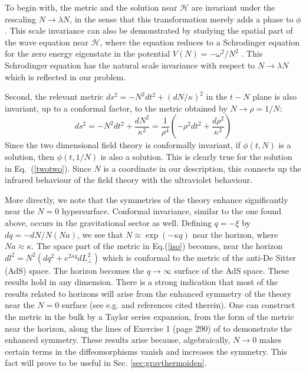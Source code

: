 \documentclass[12pt]{iopart}
\begin{document}
    To begin with, the  metric and the solution near $\mathcal{H}$ are  invariant under the rescaling
   $N\to \lambda N$,  in the sense that this transformation merely adds a phase  to 
   $\phi$. This scale invariance can also be demonstrated by studying the spatial part of the 
   wave equation \cite{Srinivasan:1998ty} near $\mathcal{H}$,  where the equation reduces to a
    Schrodinger equation
  for the zero energy eigenstate in
  the potential $V(N) = - \omega^2/N^2$ .
   This Schrodinger equation has the natural scale invariance with respect to $N\to \lambda N$
   which is reflected in our problem. 

Second, the relevant metric $ds^2=-N^2 dt^2+(dN/\kappa)^2$ in the $t-N$
plane is also invariant, up to a conformal factor, to the metric obtained by $N\to \rho=1/N$:
\begin{equation}
ds^2=-N^2 dt^2+\frac{dN^2}{\kappa^2}=\frac{1}{\rho^4}(-\rho^2 dt^2+\frac{d\rho^2}{\kappa^2})
\end{equation}
Since the two dimensional field theory is conformally invariant, if $\phi(t,N)$ is a solution, then
$\phi(t,1/N)$ is also a solution. This is clearly true for the solution in Eq.~(\ref{twotwo}). Since $N$ is a coordinate in our description, this connects up the infrared behaviour of the field theory with the ultraviolet behaviour.   

  More directly, we note that the symmetries of the theory enhance significantly near the
$N=0$ hypersurface.
Conformal invariance,  similar to the one found above, occurs in the  gravitational sector as well.
Defining  $q=-\xi$ by $dq=-dN/N(Na)$, we see that $N\approx\exp(-\kappa q)$ near the horizon, where $Na\approx \kappa.$ The space part of the metric in Eq.(\ref{iso}) becomes, near the horizon
$dl^2=N^2(dq^2+e^{2\kappa q}dL_\perp^2)$
which is conformal to the metric of the anti-De Sitter (AdS) space. The horizon
becomes the $q\to\infty$ surface of the AdS space. These results hold in any dimension.
There is a strong indication that most of the results related to horizons
 will arise from the enhanced symmetry of the theory near
the $N=0$ surface (see e.g. \cite{Carlip:1999cy,Park:1999tj,Park:2001zn,grumiller07} and references cited therein).
One can construct the metric in the bulk by a Taylor
series expansion, from the form of the metric near the horizon,
along the lines of Exercise 1 (page 290) of \cite{lltwo} to demonstrate the enhanced symmetry.
These results arise  because, algebraically, $N\to 0$ makes certain terms
in the diffeomorphisms vanish and increases the symmetry. This fact will prove to be useful in Sec. \ref{sec:gravthermoiden}.
\end{document}
